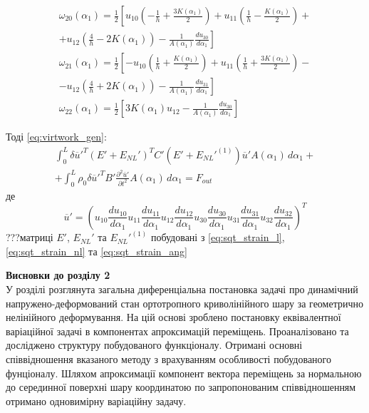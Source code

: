 \documentclass[10pt,a4paper]{article}
\numberwithin{figure}{section}
\numberwithin{equation}{section}
\begin{document}
\begin{equation}\label{eq:sqt_strain_ang}
\begin{aligned}
\omega_{20}\left(\alpha_1\right)=\frac12 
\left[
u_{10}
\left( -\frac{1}{h}+\frac{3K\left( \alpha_1 \right)}{2} \right)
+u_{11}\left( \frac{1}{h}-\frac{K\left( \alpha_1 \right)}{2} \right)+\right.\\
\left.
+u_{12}\left( \frac{4}{h}-2K\left( \alpha_1 \right) \right)
 - \frac{1}{A\left(\alpha_1\right)}\frac{du_{30}}{d\alpha_1}
\right]\\
\omega_{21}\left(\alpha_1\right)=\frac12 
\left[
-u_{10}
\left( \frac{1}{h}+\frac{K\left( \alpha_1 \right)}{2} \right)
+u_{11}\left( \frac{1}{h}+\frac{3K\left( \alpha_1 \right)}{2} \right)-\right.\\
\left.
-u_{12}\left( \frac{4}{h}+2K\left( \alpha_1 \right) \right)
 - \frac{1}{A\left(\alpha_1\right)}\frac{du_{31}}{d\alpha_1}
\right]\\
\omega_{22}\left(\alpha_1\right)=\frac12 
\left[3K\left( \alpha_1 \right)u_{12}
 - \frac{1}{A\left(\alpha_1\right)}\frac{du_{30}}{d\alpha_1}
\right]
\end{aligned}
\end{equation}


Тоді \eqref{eq:virtwork_gen}:
\begin{multline}
\int_0^L \delta\overline{u}'^T \left( E' + E_{NL}' \right)^T C' \left( E' + E_{NL}'^{(1)} \right)\overline{u}' A\left(\alpha_1\right)\, d\alpha_1+\\+\int_0^L \rho_0 \delta\overline{u}'^T B'\frac{\partial^2 \overline{u}'}{\partial t^2} A\left(\alpha_1\right)\, d\alpha_1=F_{out}
\end{multline}
де
\[
\overline{u}' = \left( u_{10}
\frac { du_{10}} { d \alpha_1}
u_{11} 
\frac { du_{11}} { d \alpha_1}
u_{12}
\frac { du_{12}} { d \alpha_1} 
u_{30}
\frac { du_{30}} { d \alpha_1}
u_{31} 
\frac { du_{31}} { d \alpha_1}
u_{32}
\frac { du_{32}} { d \alpha_1} 
\right)^T
\]
???матриці $E'$, $E_{NL}'$ та $E_{NL}'^{(1)}$ побудовані з \eqref{eq:sqt_strain_l}, \eqref{eq:sqt_strain_nl} та \eqref{eq:sqt_strain_ang}

\textbf{Висновки до розділу 2}\\
\vspace{1em}
У розділі розглянута загальна диференціальна постановка задачі про динамічний напружено-деформований стан ортотропного криволінійного шару за геометрично нелінійного деформування. На цій основі зроблено постановку еквівалентної варіаційної задачі в компонентах апроксимацій переміщень. Проаналізовано та досліджено структуру побудованого функціоналу. Отримані основні співвідношення вказаного методу з врахуванням особливості побудованого фунціоналу. Шляхом апроксимації компонент вектора переміщень за нормальною до серединної поверхні шару координатою по запропонованим співвідношенням отримано одновимірну варіаційну задачу. 
\end{document}
